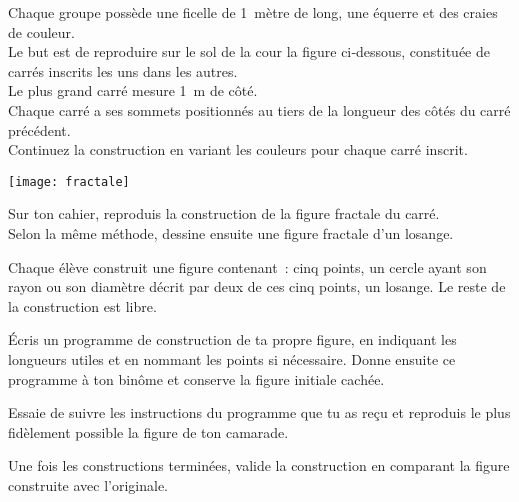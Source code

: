
\begin{TP}[Fractale]


Chaque groupe possède une ficelle de 1 mètre de long, une équerre et des craies de couleur.\\[0.5em]
Le but est de reproduire sur le sol de la cour la figure ci‑dessous, constituée de carrés inscrits les uns dans les autres. \\[0.5em]
Le plus grand carré mesure 1 m de côté.\\[0.5em]
Chaque carré a ses sommets positionnés au tiers de la longueur des côtés du carré précédent.\\[0.5em]
Continuez la construction en variant les couleurs pour chaque carré inscrit.\\[0.5em]
\begin{center} \texttt{[image: fractale]} \end{center}


Sur ton cahier, reproduis la construction de la figure fractale du carré.\\[0.5em]
Selon la même méthode, dessine ensuite une figure fractale d'un losange.

\end{TP}


\begin{TP}

Chaque élève construit une figure contenant : cinq points, un cercle ayant son rayon ou son diamètre décrit par deux de ces cinq points, un losange. Le reste de la construction est libre.

Écris un programme de construction de ta propre figure, en indiquant les longueurs utiles et en nommant les points si nécessaire. Donne ensuite ce programme à ton binôme et conserve la figure initiale cachée.

Essaie de suivre les instructions du programme que tu as reçu et reproduis le plus fidèlement possible la figure de ton camarade.

Une fois les constructions terminées, valide la construction en comparant la figure construite avec l'originale.

\end{TP}

\newpage
